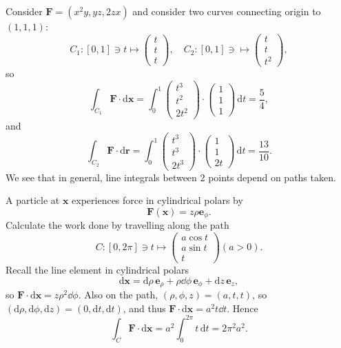 \begin{example}\label{eg:3.1}
    Consider $ \mathbf{F} = (x^2y,yz,2zx) $ and consider two curves connecting origin to $ (1,1,1) $:
    \[
        C_1: [0,1]\ni t \mapsto \begin{pmatrix}
            t \\ t \\ t
        \end{pmatrix},\quad 
        C_2 : [0,1]\ni \mapsto \begin{pmatrix}
            t \\ t \\ t^2
        \end{pmatrix},
    \]
    so 
    \[
        \int_{C_1} \mathbf{F} \cdot\mathrm{d}\mathbf{x} = \int_{0}^{1} \begin{pmatrix}
            t^3 \\ t^2 \\ 2t^2
        \end{pmatrix}\cdot \begin{pmatrix}
            1 \\ 1 \\ 1
        \end{pmatrix} \,\mathrm{d}t = \frac{5}{4},
    \]
    and 
    \[
        \int_{C_2} \mathbf{F} \cdot\mathrm{d}\mathbf{r} = \int_{0}^{1} \begin{pmatrix}
            t^3 \\ t^3 \\ 2t^3
        \end{pmatrix}\cdot \begin{pmatrix}
            1 \\ 1 \\ 2t
        \end{pmatrix} \,\mathrm{d}t = \frac{13}{10}.
    \]
    We see that in general, line integrals between 2 points depend on paths taken.
\end{example}
\begin{example}
    A particle at $ \mathbf{x} $ experiences force in cylindrical polars by
    \[
        \mathbf{F}(\mathbf{x}) = z\rho\mathbf{e}_\phi.
    \]
    Calculate the work done by travelling along the path
    \[
        C: [0,2\pi]\ni t \mapsto \begin{pmatrix}
            a\cos t \\ a\sin t \\ t
        \end{pmatrix}(a>0).
    \]
    Recall the line element in cylindrical polars
    \[
        \mathrm{d} \mathbf{x} = \mathrm{d} \rho\,\mathbf{e}_\rho+\rho\dd \phi\,\mathbf{e}_\phi+\mathrm{d} z\,\mathbf{e}_z,
    \]
    so $ \mathbf{F}\cdot \mathrm{d} \mathbf{x} = z\rho^2 \dd  \phi $. Also on the path, $ (\rho,\phi,z) = (a,t,t) $, so $ (\mathrm{d} \rho,\mathrm{d} \phi,\mathrm{d} z) = (0,\mathrm{d} t,\mathrm{d} t) $, and thus $ \mathbf{F}\cdot \mathrm{d} \mathbf{x} = a^2t\dd t $. Hence
    \[
        \int_{C} \mathbf{F} \cdot\mathrm{d}\mathbf{x} = a^2 \int_{0}^{2\pi} t \,\mathrm{d}t = 2\pi^2 a^2.
    \]
\end{example}


